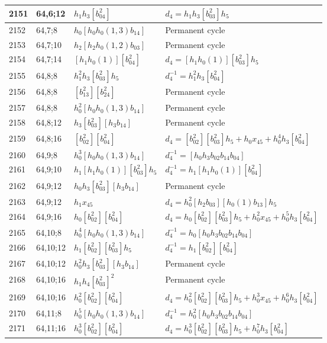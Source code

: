\documentclass{article}
\begin{document}
\begin{longtable}{|l|l|>{\raggedright\arraybackslash}p{6cm}|>{\raggedright\arraybackslash}p{6cm}|}
\hline
2151 & 64,6;12 & $h_1h_3[b_{04}^2]$ &$d_{4}=h_1h_3[b_{03}^2]h_5$\\
\hline
2152 & 64,7;8 & $h_0[h_0h_0(1, 3)b_{14}]$ & Permanent cycle\\
\hline
2153 & 64,7;10 & $h_2[h_2h_0(1, 2)b_{03}]$ & Permanent cycle\\
\hline
2154 & 64,7;14 & $[h_1h_0(1)][b_{04}^2]$ &$d_{4}=[h_1h_0(1)][b_{03}^2]h_5$\\
\hline
2155 & 64,8;8 & $h_1^2h_3[b_{03}^2]h_5$ & $d_{4}^{-1}=h_1^2h_3[b_{04}^2]$\\
2156 & 64,8;8 & $[b_{13}^2][b_{24}^2]$ & Permanent cycle\\
2157 & 64,8;8 & $h_0^2[h_0h_0(1, 3)b_{14}]$ & Permanent cycle\\
\hline
2158 & 64,8;12 & $h_3[b_{03}^2][h_3b_{14}]$ & Permanent cycle\\
\hline
2159 & 64,8;16 & $[b_{02}^2][b_{04}^2]$ &$d_{4}=[b_{02}^2][b_{03}^2]h_5 + h_0x_{45} + h_0^4h_3[b_{04}^2]$\\
\hline
2160 & 64,9;8 & $h_0^3[h_0h_0(1, 3)b_{14}]$ & $d_{4}^{-1}=[h_0h_3b_{02}b_{14}b_{04}]$\\
\hline
2161 & 64,9;10 & $h_1[h_1h_0(1)][b_{03}^2]h_5$ & $d_{4}^{-1}=h_1[h_1h_0(1)][b_{04}^2]$\\
\hline
2162 & 64,9;12 & $h_0h_3[b_{03}^2][h_3b_{14}]$ & Permanent cycle\\
2163 & 64,9;12 & $h_1x_{45}$ &$d_{4}=h_0^2[h_2b_{03}][h_0(1)b_{13}]h_5$\\
\hline
2164 & 64,9;16 & $h_0[b_{02}^2][b_{04}^2]$ &$d_{4}=h_0[b_{02}^2][b_{03}^2]h_5 + h_0^2x_{45} + h_0^5h_3[b_{04}^2]$\\
\hline
2165 & 64,10;8 & $h_0^4[h_0h_0(1, 3)b_{14}]$ & $d_{4}^{-1}=h_0[h_0h_3b_{02}b_{14}b_{04}]$\\
\hline
2166 & 64,10;12 & $h_1[b_{02}^2][b_{03}^2]h_5$ & $d_{4}^{-1}=h_1[b_{02}^2][b_{04}^2]$\\
2167 & 64,10;12 & $h_0^2h_3[b_{03}^2][h_3b_{14}]$ & Permanent cycle\\
\hline
2168 & 64,10;16 & $h_1h_4[b_{03}^2]^2$ & Permanent cycle\\
2169 & 64,10;16 & $h_0^2[b_{02}^2][b_{04}^2]$ &$d_{4}=h_0^2[b_{02}^2][b_{03}^2]h_5 + h_0^3x_{45} + h_0^6h_3[b_{04}^2]$\\
\hline
2170 & 64,11;8 & $h_0^5[h_0h_0(1, 3)b_{14}]$ & $d_{4}^{-1}=h_0^2[h_0h_3b_{02}b_{14}b_{04}]$\\
\hline
2171 & 64,11;16 & $h_0^3[b_{02}^2][b_{04}^2]$ &$d_{4}=h_0^3[b_{02}^2][b_{03}^2]h_5 + h_0^7h_3[b_{04}^2]$\\

\end{longtable}
\end{document}
